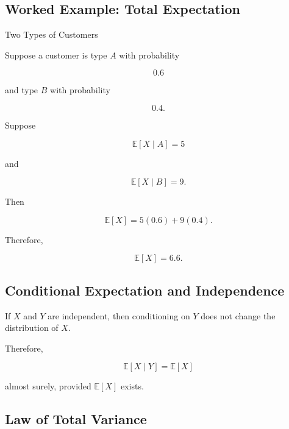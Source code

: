 \subsection{Worked Example: Total Expectation}
\label{subsec:worked-total-expectation}

\begin{workedexamplebox}{Two Types of Customers}

Suppose a customer is type \(A\) with probability

\[
0.6
\]

and type \(B\) with probability

\[
0.4.
\]

Suppose

\[
\mathbb{E}[X\mid A]=5
\]

and

\[
\mathbb{E}[X\mid B]=9.
\]

Then

\[
\mathbb{E}[X]
=
5(0.6)+9(0.4).
\]

Therefore,

\begin{answerbox}
\[
\boxed{
\mathbb{E}[X]=6.6.
}
\]
\end{answerbox}

\end{workedexamplebox}

\subsection{Conditional Expectation and Independence}
\label{subsec:conditional-expectation-independence}

If \(X\) and \(Y\) are independent, then conditioning on \(Y\) does not
change the distribution of \(X\).

Therefore,

\[
\boxed{
\mathbb{E}[X\mid Y]
=
\mathbb{E}[X]
}
\]

almost surely, provided \(\mathbb{E}[X]\) exists.

\subsection{Law of Total Variance}
\label{subsec:law-total-variance}

